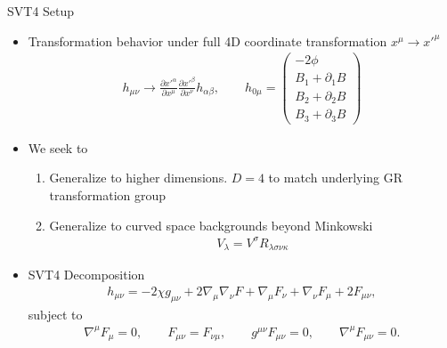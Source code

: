 \documentclass[8pt,aspectratio=1610]{beamer}
\begin{document}
\begin{frame}{SVT4 Setup}
	\begin{itemize}
		\item Transformation behavior under full 4D coordinate transformation $x^\mu \to x'^\mu$
		\begin{eqnarray}
		h_{\mu\nu} \to \frac{\partial x'^\alpha}{\partial x^\mu}\frac{\partial x'^\beta}{\partial x^\nu}h_{\alpha\beta},
		\qquad
		h_{0\mu} = \begin{pmatrix}-2\phi\\B_1 + \partial_1 B\\B_2 + \partial_2 B\\B_3 + \partial_3 B
		\end{pmatrix}
		\end{eqnarray}
		\item We seek to
		\begin{enumerate}
			\begingroup
			\normalsize
			\item Generalize to higher dimensions. $D=4$ to match underlying GR transformation group\vspace{1mm}
			\item Generalize to curved space backgrounds beyond Minkowski
			\begin{eqnarray}
			[\nabla_\kappa, \nabla_\nu] V_\lambda = V^\sigma R_{\lambda\sigma\nu\kappa}
			\end{eqnarray}
			\endgroup
		\end{enumerate}
		\item SVT4 Decomposition
		\begin{eqnarray}
		h_{\mu\nu} = -2\chi g_{\mu\nu} + 2\nabla_\mu\nabla_\nu F + \nabla_\mu F_\nu + \nabla_\nu F_{\mu} + 2F_{\mu\nu},
		\end{eqnarray}
		subject to
		\begin{eqnarray}
		\nabla^\mu F_{\mu} = 0,\qquad F_{\mu\nu} = F_{\nu\mu}, \qquad g^{\mu\nu}F_{\mu\nu} = 0,\qquad \nabla^\mu F_{\mu\nu} = 0.
		\end{eqnarray}
	\end{itemize}
\end{frame}

\end{document}
